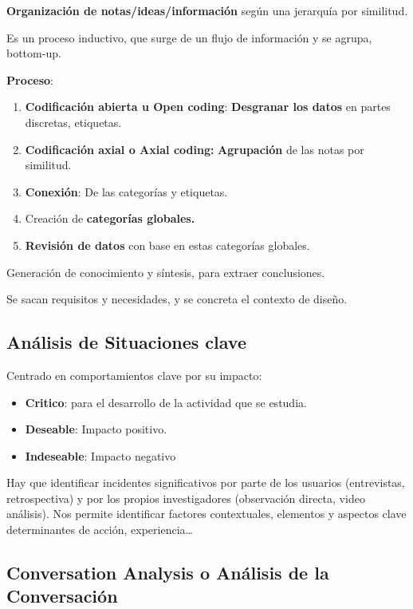 \documentclass[12pt]{report} %
\begin{document}
\textbf{Organización de notas/ideas/información} según una jerarquía por
similitud.

Es un proceso inductivo, que surge de un flujo de información y se
agrupa, bottom-up.

\textbf{Proceso}:

\begin{enumerate}
\def\labelenumi{\arabic{enumi}.}

\item
  \textbf{Codificación abierta u Open coding}: \textbf{Desgranar los
  datos} en partes discretas, etiquetas.
\item
  \textbf{Codificación axial o Axial coding:} \textbf{Agrupación} de las
  notas por similitud.
\item
  \textbf{Conexión}: De las categorías y etiquetas.
\item
  Creación de \textbf{categorías globales.}
\item
  \textbf{Revisión de datos} con base en estas categorías globales.
\end{enumerate}

Generación de conocimiento y síntesis, para extraer conclusiones.

Se sacan requisitos y necesidades, y se concreta el contexto de diseño.

\subsection{Análisis de Situaciones
clave}

Centrado en comportamientos clave por su impacto:

\begin{itemize}

\item
  \textbf{Critico}: para el desarrollo de la actividad que se estudia.
\item
  \textbf{Deseable}: Impacto positivo.
\item
  \textbf{Indeseable}: Impacto negativo
\end{itemize}

Hay que identificar incidentes significativos por parte de los usuarios
(entrevistas, retrospectiva) y por los propios investigadores
(observación directa, video análisis). Nos permite identificar factores
contextuales, elementos y aspectos clave determinantes de acción,
experiencia\ldots{}

\subsection{Conversation Analysis o Análisis de la
Conversación}
\end{document}
